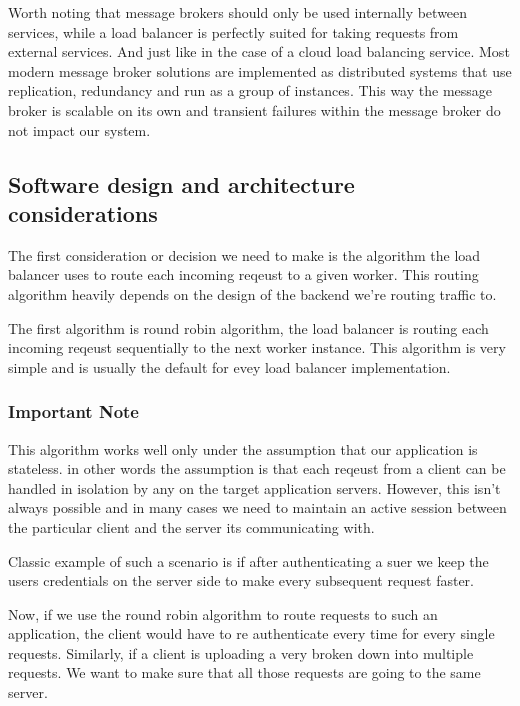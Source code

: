 \begin{note}
    Worth noting that message brokers should only be used internally between services, while a load balancer is perfectly suited for taking requests from external services.
    And just like in the case of a cloud load balancing service.
    Most modern message broker solutions are implemented as distributed systems that use replication, redundancy and run as a group of instances.
    This way the message broker is scalable on its own and transient failures within the message broker do not impact our system.
\end{note}

\subsection{Software design and architecture considerations}
The first consideration or decision we need to make is the algorithm the load balancer uses to route each incoming reqeust to a given worker.
This routing algorithm heavily depends on the design of the backend we're routing traffic to.

The first algorithm is round robin algorithm, the load balancer is routing each incoming reqeust sequentially to the next worker instance.
This algorithm is very simple and is usually the default for evey load balancer implementation.

\subsubsection{Important Note} This algorithm works well only under the assumption that our application is stateless.
in other words the assumption is that each reqeust from a client can be handled in isolation by any on the target application servers.
However, this isn't always possible and in many cases we need to maintain an active session between the particular client and the server its communicating with.

Classic example of such a scenario is if after authenticating a suer we keep the users credentials on the server side to make every subsequent request faster.

Now, if we use the round robin algorithm to route requests to such an application, the client would have to re authenticate every time for every single requests.
Similarly, if a client is uploading a very broken down into multiple requests.
We want to make sure that all those requests are going to the same server.

